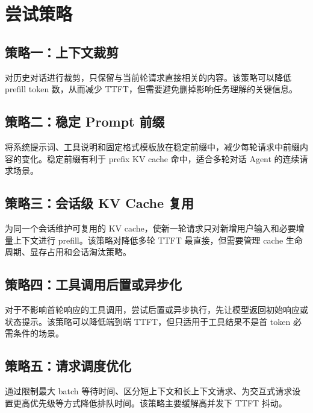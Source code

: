 \section{尝试策略}

\subsection{策略一：上下文裁剪}

对历史对话进行裁剪，只保留与当前轮请求直接相关的内容。该策略可以降低 prefill token 数，从而减少 TTFT，但需要避免删掉影响任务理解的关键信息。

\subsection{策略二：稳定 Prompt 前缀}

将系统提示词、工具说明和固定格式模板放在稳定前缀中，减少每轮请求中前缀内容的变化。稳定前缀有利于 prefix KV cache 命中，适合多轮对话 Agent 的连续请求场景。

\subsection{策略三：会话级 KV Cache 复用}

为同一个会话维护可复用的 KV cache，使新一轮请求只对新增用户输入和必要增量上下文进行 prefill。该策略对降低多轮 TTFT 最直接，但需要管理 cache 生命周期、显存占用和会话淘汰策略。

\subsection{策略四：工具调用后置或异步化}

对于不影响首轮响应的工具调用，尝试后置或异步执行，先让模型返回初始响应或状态提示。该策略可以降低端到端 TTFT，但只适用于工具结果不是首 token 必需条件的场景。

\subsection{策略五：请求调度优化}

通过限制最大 batch 等待时间、区分短上下文和长上下文请求、为交互式请求设置更高优先级等方式降低排队时间。该策略主要缓解高并发下 TTFT 抖动。
